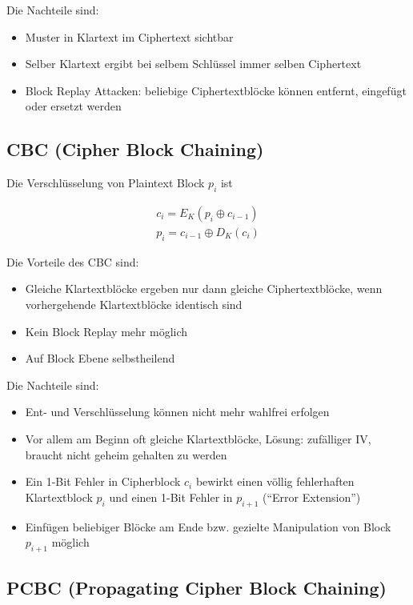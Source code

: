 Die Nachteile sind:

\begin{itemize}
    \item Muster in Klartext im Ciphertext sichtbar
    \item Selber Klartext ergibt bei selbem Schlüssel immer selben Ciphertext
    \item Block Replay Attacken: beliebige Ciphertextblöcke können entfernt, eingefügt oder ersetzt werden
\end{itemize}


\subsection{CBC (Cipher Block Chaining)}

Die Verschlüsselung von Plaintext Block $p_i$ ist

\begin{align*}
    c_i = E_K(p_i \oplus c_{i-1}) \\
    p_i = c_{i-1} \oplus D_K(c_i)
\end{align*}

Die Vorteile des CBC sind: 

\begin{itemize}
    \item Gleiche Klartextblöcke ergeben nur dann gleiche Ciphertextblöcke, wenn vorhergehende Klartextblöcke identisch sind
    \item Kein Block Replay mehr möglich
    \item Auf Block Ebene selbstheilend
\end{itemize}

Die Nachteile sind:

\begin{itemize}
    \item Ent- und Verschlüsselung können nicht mehr wahlfrei erfolgen
    \item Vor allem am Beginn oft gleiche Klartextblöcke, Lösung: zufälliger IV, braucht nicht geheim gehalten zu werden
    \item Ein 1-Bit Fehler in Cipherblock $c_i$ bewirkt einen völlig fehlerhaften Klartextblock $p_i$ und einen 1-Bit Fehler in $p_{i+1}$ (``Error Extension'')
    \item Einfügen beliebiger Blöcke am Ende bzw. gezielte Manipulation von Block $p_{i+1}$ möglich
\end{itemize}

\subsection{PCBC (Propagating Cipher Block Chaining)}

